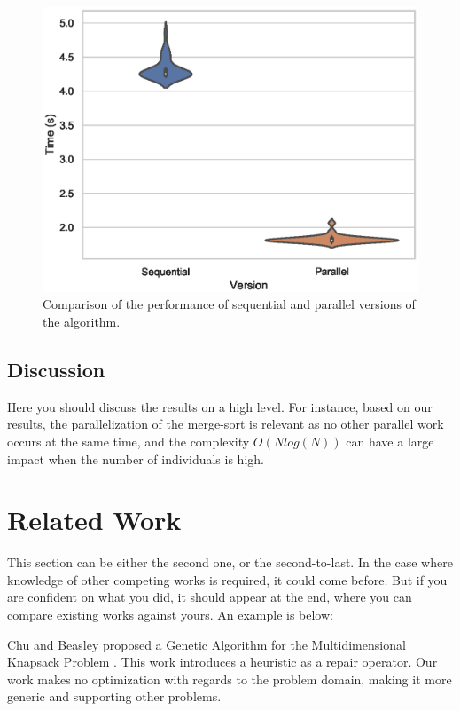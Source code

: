 \documentclass[runningheads]{llncs}
\begin{document}
\begin{figure}[htbp]
\includegraphics[width=\textwidth]{code/performance.eps}
\caption{Comparison of the performance of sequential and parallel versions of the algorithm.} \label{fig1}
\end{figure}


\subsection{Discussion}

Here you should discuss the results on a high level. For instance, based on our results, the parallelization of the merge-sort is relevant as no other parallel work occurs at the same time, and the complexity $O(N log(N))$ can have a large impact when the number of individuals is high.

\section{Related Work}

This section can be either the second one, or the second-to-last. In the case where knowledge of other competing works is required, it could come before. But if you are confident on what you did, it should appear at the end, where you can compare existing works against yours. An example is below:

Chu and Beasley proposed a Genetic Algorithm for the Multidimensional Knapsack Problem \cite{DBLP:journals/heuristics/ChuB98}. This work introduces a heuristic as a repair operator. Our work makes no optimization with regards to the problem domain, making it more generic and supporting other problems.
\end{document}
